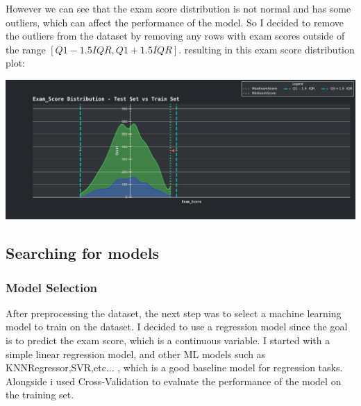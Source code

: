 \documentclass{assignment}
\begin{document}
However we can see that the exam score distribution is not normal and has some outliers, which can affect the performance of the model.
So I decided to remove the outliers from the dataset by removing any rows with exam scores outside of the range $[Q1 - 1.5IQR,Q1 + 1.5IQR]$.
resulting in this exam score distribution plot: 
\begin{center}
    \includegraphics[width=6.5in]{../report/assets/Exam_Score_Distribution_test_vs_train_without_outliers.pdf}
\end{center}

\newpage
\subsection{Searching for models}
\subsubsection{Model Selection}
After preprocessing the dataset, the next step was to select a machine learning model to train on the dataset.
I decided to use a regression model since the goal is to predict the exam score, which is a continuous variable.
I started with a simple linear regression model, and other ML models such as  KNNRegressor,SVR,etc... , which is a good baseline model for regression tasks.
Alongside i used Cross-Validation to evaluate the performance of the model on the training set.

\end{document}
